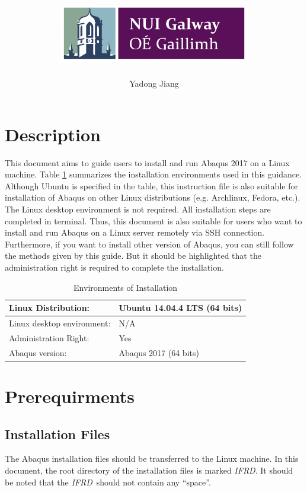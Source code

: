 \documentclass[12pt]{article}
\title{\includegraphics[height=1in]{Figures/NUIG_Logo.jpg}\\ \tit}
\author[1]{Yadong Jiang}
\affil[1]{College of Engineering and Informatics, National University of Ireland Galway}
\date{}
\newcommand{\ifp}{\textit{IFRD}}
\begin{document}
\maketitle

\newpage

\section*{Description}
This document aims to guide users to install and run Abaqus 2017 on a Linux machine. Table \ref{tb-1} summarizes the installation environments used in this guidance. Although Ubuntu is specified in the table, this instruction file is also suitable for installation of Abaqus on other Linux distributions (e.g. Archlinux, Fedora, etc.). The Linux desktop environment is not required. All installation steps are completed in terminal. Thus, this document is also suitable for users who want to install and run Abaqus on a Linux server remotely via SSH connection. Furthermore, if you want to install other version of Abaqus, you can still follow the methods given by this guide. But it should be highlighted that the administration right is required to complete the installation.

\begin{table}[h!]
\caption{Environments of Installation}
\begin{center}
\begin{tabular}{l l}
    \hline
    Linux Distribution: & Ubuntu 14.04.4 LTS (64 bits)\\
    \hline
    Linux desktop environment: & N/A \\
    \hline
    Administration Right: & Yes \\
    \hline
    Abaqus version: & Abaqus 2017 (64 bits) \\
    \hline
\end{tabular}
\end{center}
\label{tb-1}
\end{table}

\section*{Prerequirments}
\subsection*{Installation Files}
The Abaqus installation files should be transferred to the Linux machine. In this document, the root directory of the installation files is marked \ifp. It should be noted that the \ifp\ should not contain any ``space''.
\end{document}

